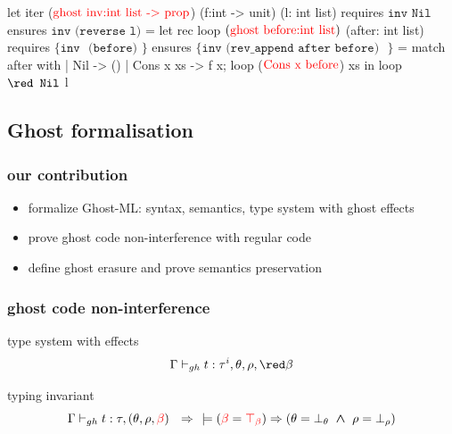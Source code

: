 \begin{frame}[fragile]
\frametitle{}
\begin{footnotesize}
\begin{whycode}
let iter ($\textcolor{red}{\text{ghost inv:int list -> prop}}$) (f:int -> unit) (l: int list)
requires { ${ \texttt{inv Nil}}$ }
ensures  { ${ \texttt{inv (reverse l)}}$ }
= let rec loop $(\textcolor{red}{\text{ghost before:int list}})$ (after: int list) 
  requires $\texttt{\{ inv { (before)} \}}$
  ensures  $\texttt{\{ inv {(rev\_append after before)} }\}$     
  = match after with 
     | Nil       -> ()
     | Cons x xs -> f x; loop ($\textcolor{red}{\text{Cons x before}}$) xs 
  in loop $\texttt{\red Nil}$ l 
\end{whycode}
\end{footnotesize}
\end{frame}
\addtocounter{framenumber}{-1}


\subsection*{Ghost formalisation}


\begin{frame}
\frametitle{our contribution}
\begin{itemize}
\item formalize Ghost-ML: syntax, semantics, type system with ghost effects \pause
\item prove ghost code non-interference with regular code \pause
\item define ghost erasure and prove semantics preservation  
\end{itemize}
\end{frame}

\begin{frame}
\frametitle{ghost code non-interference}
type system with effects 
$$\Gamma \vdash_{gh} t: \tau^{i}, \theta, \rho, {\red \beta} $$

\bigskip\pause
typing invariant 
$$\Gamma \vdash_{gh} t : \tau, (\theta, \rho, \textcolor{red}{\beta}) 
 ~~ \Rightarrow ~~
\models (\textcolor{red}{\beta} = \textcolor{red}{\top_\beta}) \Rightarrow (\theta = \bot_\theta \boldsymbol{~\wedge~} \rho = \bot_\rho) $$
\end{frame}


